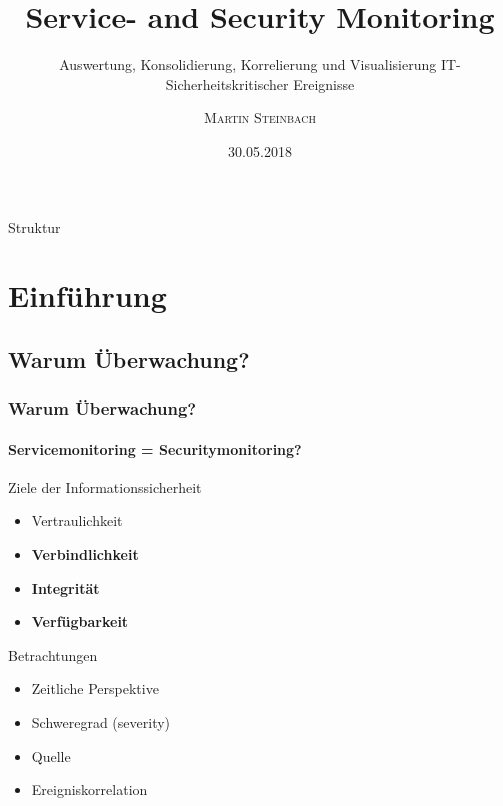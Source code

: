 \documentclass[10pt]{beamer} %
\title{Service- and Security Monitoring}
\subtitle{Auswertung, Konsolidierung, Korrelierung und Visualisierung
IT-Sicherheitskritischer Ereignisse\\}
\author{\textsc{Martin Steinbach}}
\date{30.05.2018}
\institute{Universität Rostock, Institut für Informatik\\\\}
\begin{document}
\begin{frame}%
  \titlepage
\end{frame}


\begin{frame}{Struktur}
  \tableofcontents[pausesections]
\end{frame}


\section{Einführung}

\subsection{Warum Überwachung?}
\begin{frame}
    \frametitle{Warum Überwachung?}
    \framesubtitle{Servicemonitoring = Securitymonitoring?}
    
    \pause
    
   \begin{exampleblock}{Ziele der Informationssicherheit}
        \begin{itemize}
            \item   Vertraulichkeit
            \item   \textbf{Verbindlichkeit}
            \item   \textbf{Integrität}       
            \item   \textbf{Verfügbarkeit}
        \end{itemize}     
   \end{exampleblock}
    \pause
    \begin{exampleblock}{Betrachtungen}
        \begin{itemize}
            \item Zeitliche Perspektive
            \item Schweregrad (severity)
            \item Quelle
            \item Ereigniskorrelation
        \end{itemize} 
    \end{exampleblock}
            
\end{frame}
\end{document}
